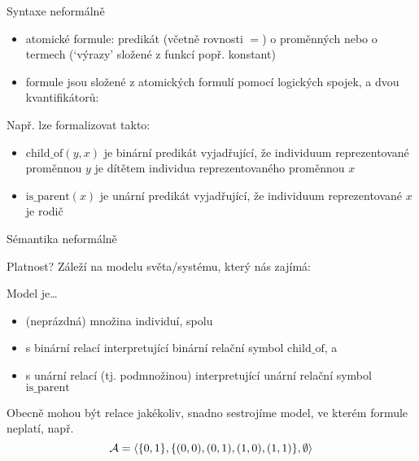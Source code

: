 \documentclass{beamer}
\begin{document}
\begin{frame}{Syntaxe neformálně}

    \begin{itemize}
        \item \alert{atomické formule}: predikát (včetně \alert{rovnosti} $=$) o proměnných nebo o \alert{termech} (`výrazy' složené z funkcí popř. konstant)
        \item \alert{formule} jsou složené z atomických formulí pomocí logických spojek, a dvou \alert{kvantifikátorů}:
    \end{itemize}  

    \medskip

    \bigskip

    Např.  lze formalizovat takto:

    \begin{itemize}
        \item \alert{$\mathrm{child\_of}(y,x)$} je binární predikát vyjadřující, že individuum reprezentované proměnnou $y$ je dítětem individua reprezentovaného proměnnou $x$
        \item \alert{$\mathrm{is\_parent}(x)$} je unární predikát vyjadřující, že individuum reprezentované $x$ je rodič
    \end{itemize}
    
\end{frame}


\begin{frame}{Sémantika neformálně}


    Platnost? Záleží na \alert{modelu} světa/systému, který nás zajímá:
    
    \alert{Model} je\dots
    \begin{itemize}
        \item (neprázdná) množina individuí, spolu
        \item s binární relací \alert{interpretující} binární relační symbol \alert{$\mathrm{child\_of}$}, a
        \item s unární relací (tj. podmnožinou) interpretující unární relační symbol \alert{$\mathrm{is\_parent}$}        
    \end{itemize}
    Obecně mohou být relace jakékoliv, snadno sestrojíme model, ve kterém formule neplatí, např. 
    $$
    \mathcal{A}=\langle\{0,1\},\{(0,0),(0,1),(1,0),(1,1)\},\emptyset\rangle
    $$

\end{frame}
\end{document}
